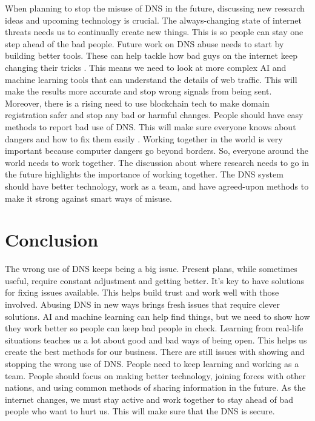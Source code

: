 When planning to stop the misuse of DNS in the future, discussing new research ideas and upcoming technology is crucial. The always-changing state of internet threats needs us to continually create new things. This is so people can stay one step ahead of the bad people. Future work on DNS abuse needs to start by building better tools. These can help tackle how bad guys on the internet keep changing their tricks \cite{bovenzi2023blockchain}. This means we need to look at more complex AI and machine learning tools that can understand the details of web traffic. This will make the results more accurate and stop wrong signals from being sent. Moreover, there is a rising need to use blockchain tech to make domain registration safer and stop any bad or harmful changes. People should have easy methods to report bad use of DNS. This will make sure everyone knows about dangers and how to fix them easily \cite{gu2021iot}. Working together in the world is very important because computer dangers go beyond borders. So, everyone around the world needs to work together. The discussion about where research needs to go in the future highlights the importance of working together. The DNS system should have better technology, work as a team, and have agreed-upon methods to make it strong against smart ways of misuse.


\section{Conclusion}

The wrong use of DNS keeps being a big issue. Present plans, while sometimes useful, require constant adjustment and getting better. It's key to have solutions for fixing issues available. This helps build trust and work well with those involved. Abusing DNS in new ways brings fresh issues that require clever solutions. AI and machine learning can help find things, but we need to show how they work better so people can keep bad people in check. Learning from real-life situations teaches us a lot about good and bad ways of being open. This helps us create the best methods for our business. There are still issues with showing and stopping the wrong use of DNS. People need to keep learning and working as a team. People should focus on making better technology, joining forces with other nations, and using common methods of sharing information in the future. As the internet changes, we must stay active and work together to stay ahead of bad people who want to hurt us. This will make sure that the DNS is secure.

